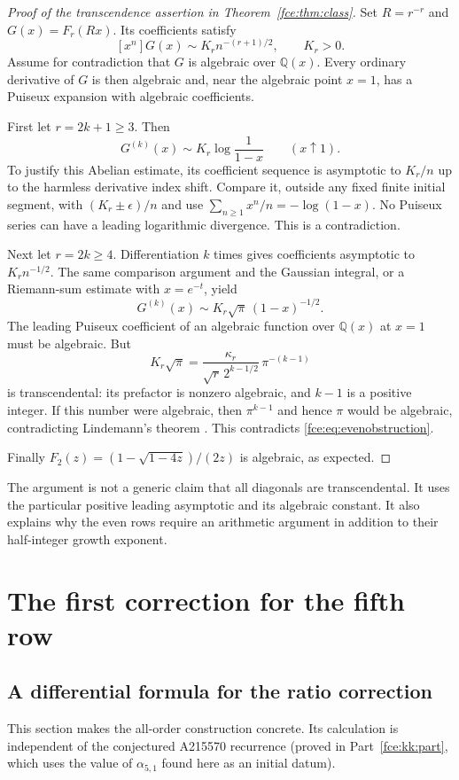 \documentclass[11pt,a4paper]{article}
\numberwithin{equation}{section}
\theoremstyle{definition}\newtheorem{definition}[theorem]{Definition}
\theoremstyle{remark}\newtheorem{remark}[theorem]{Remark}
\newcommand{\Q}{\mathbb Q}
\begin{document}
\begin{proof}[Proof of the transcendence assertion in Theorem~\ref{fce:thm:class}]
Set $R=r^{-r}$ and $G(x)=F_r(Rx)$. Its coefficients satisfy
\[
 [x^n]G(x)\sim K_r n^{-(r+1)/2},\qquad K_r>0.
\]
Assume for contradiction that $G$ is algebraic over $\Q(x)$. Every
ordinary derivative of $G$ is then algebraic and, near the algebraic
point $x=1$, has a Puiseux expansion with algebraic coefficients.

First let $r=2k+1\ge3$. Then
\[
 G^{(k)}(x)\sim K_r\log\frac1{1-x}\qquad(x\uparrow1).
\]
To justify this Abelian estimate, its coefficient sequence is asymptotic
to $K_r/n$ up to the harmless derivative index shift. Compare it, outside
any fixed finite initial segment, with $(K_r\pm\epsilon)/n$ and use
$\sum_{n\ge1}x^n/n=-\log(1-x)$. No Puiseux series can have a leading
logarithmic divergence. This is a contradiction.

Next let $r=2k\ge4$. Differentiation $k$ times gives coefficients
asymptotic to $K_r n^{-1/2}$. The same comparison argument and the
Gaussian integral, or a Riemann-sum estimate with $x=e^{-t}$, yield
\begin{equation}\label{fce:eq:evenobstruction}
 G^{(k)}(x)\sim K_r\sqrt\pi\,(1-x)^{-1/2}.
\end{equation}
The leading Puiseux coefficient of an algebraic function over $\Q(x)$
at $x=1$ must be algebraic. But
\[
 K_r\sqrt\pi
 =\frac{\kappa_r}{\sqrt r\,2^{k-1/2}}\,\pi^{-(k-1)}
\]
is transcendental: its prefactor is nonzero algebraic, and $k-1$ is a
positive integer. If this number were algebraic, then $\pi^{k-1}$ and
hence $\pi$ would be algebraic, contradicting Lindemann's theorem
\cite{lindemann}. This contradicts \eqref{fce:eq:evenobstruction}.

Finally $F_2(z)=(1-\sqrt{1-4z})/(2z)$ is algebraic, as expected.
\end{proof}
The argument is not a generic claim that all diagonals are transcendental.
It uses the particular positive leading asymptotic and its algebraic
constant. It also explains why the even rows require an arithmetic
argument in addition to their half-integer growth exponent.

\section{The first correction for the fifth row}\label{fce:sec:correction}
\subsection{A differential formula for the ratio correction}
This section makes the all-order construction concrete. Its calculation
is independent of the conjectured A215570 recurrence (proved in
Part~\ref{fce:kk:part}, which uses the value of $\alpha_{5,1}$ found here
as an initial datum).
\end{document}
